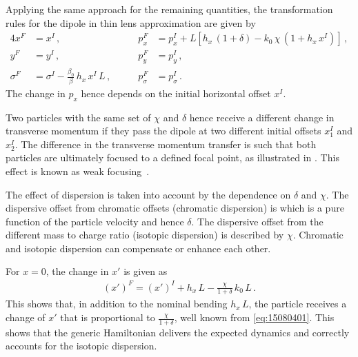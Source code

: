 Applying the same approach for the remaining quantities, the transformation rules for the dipole in thin lens approximation are given by
\begin{alignat}{4}
x^F &= x^I \, ,   &  p_x^F &= p_x^I + L \left[ h_x \, (1+\delta) - k_0 \, \chi \, (1 + h_x \, x^I)  \right]\, \label{eq:thindipolekick} , \\  
y^F &= y^I \, ,  &  p_y^F &= p_y^I\, ,\\ 
\sigma^F &= \sigma^I - \frac{\beta_0}{\beta} \, h_x \, x^I \, L \, , \quad \quad   & p_\sigma^F & = p_\sigma^I \, \label{eq:thindip02} .
\end{alignat}
%
%
The change in $p_x$ hence depends on the initial horizontal offset $x^I$. 

Two particles with the same set of $\chi$ and $\delta$ hence receive a different change in transverse momentum if they pass the dipole at two different initial offsets $x^I_1$ and $x^I_2$. The difference in the transverse momentum transfer is such that both particles are ultimately focused to a defined focal point, as illustrated in . This effect is known as weak focusing~\cite{wolski2014beam}. 

%
The effect of dispersion is taken into account by the dependence on $\delta$ and $\chi$. The dispersive offset from chromatic offsets (chromatic dispersion) is which is a pure function of the particle velocity and hence $\delta$. The dispersive offset from the different mass to charge ratio (isotopic dispersion) is described by $\chi$. Chromatic and isotopic dispersion can compensate or enhance each other. 

For $x=0$, the change in $x'$ is given as 
\begin{align}
  (x')^F = (x')^I + h_x \, L - \frac{\chi}{1+\delta} \, k_0 \, L \, .
\end{align}
This shows that, in addition to the nominal bending $h_x \, L$, the particle receives a change of $x'$ that is proportional to $\frac{\chi}{1+\delta}$, well known from \eqref{eq:15080401}. This shows that the generic Hamiltonian delivers the expected dynamics and correctly accounts for the isotopic dispersion.

